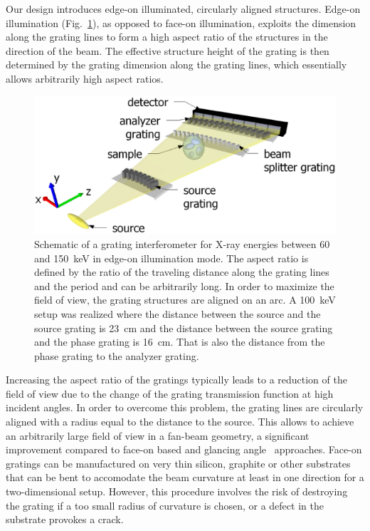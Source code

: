 Our design introduces edge-on illuminated,  circularly aligned structures.
Edge-on illumination (Fig.~\ref{fig:schematic}), as
opposed to face-on illumination, exploits the dimension along the grating
lines to form a high aspect ratio of the structures in the direction of the beam. The
effective structure height of the grating is then determined by the grating
dimension along the grating lines, which essentially allows arbitrarily high
aspect ratios. 
\begin{figure}[h!]
    \centering
    \includegraphics[width=\textwidth]{gfx/figure1.eps}
    \caption[Edge-on grating interferometer.]{Schematic of a grating
        interferometer for X-ray energies between 60 and
        \SI{150}{\kilo\electronvolt} in edge-on illumination mode. The
        aspect ratio is defined by the ratio of the traveling distance along the
        grating lines and the period and can be arbitrarily long. In order to maximize
        the field of view, the grating structures are aligned on an
        arc. A \SI{100}{\kilo\eV} setup was realized where the distance
        between the source and the source grating is \SI{23}{\centi\metre}
    and the distance between the source grating and the phase grating is
    \SI{16}{\centi\metre}. That is also the distance from the phase grating
to the analyzer grating.}%
\label{fig:schematic}
\end{figure}

Increasing the aspect ratio of the gratings typically leads to a reduction
of the field of view due to the change of the grating transmission function
at high incident angles. In order to overcome this problem, the grating
lines are circularly aligned with a radius equal to the distance to the
source. This allows to achieve an arbitrarily large field of view in a
fan-beam geometry, a significant improvement compared to face-on based and
glancing angle~\parencite{Stutman2012a} approaches.
Face-on gratings can be manufactured on very thin silicon,
graphite or other substrates~\parencite{doi:10.1063/1.4939055} that can be
bent to accomodate the beam curvature at least in one direction for a
two-dimensional setup. However, this procedure involves the risk of
destroying the grating if a too small radius of curvature is chosen, or a
defect in the substrate provokes a crack.                                                

